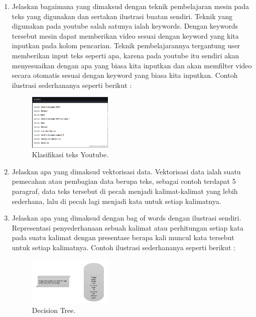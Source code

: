 \begin{enumerate}
	\item Jelaskan bagaimana yang dimaksud dengan teknik pembelajaran mesin pada teks yang digunakan dan sertakan ilustrasi buatan sendiri.
	\hfill\break
	Teknik yang digunakan pada youtube salah satunya ialah keywords. Dengan keywords tersebut mesin dapat memberikan video sesuai dengan keyword yang kita inputkan pada kolom pencarian. Teknik pembelajarannya tergantung user memberikan input teks seperti apa, karena pada youtube itu sendiri akan menyesuaikan dengan apa yang biasa kita inputkan dan akan memfilter video secara otomatis sesuai dengan keyword yang biasa kita inputkan. Contoh ilustrasi sederhananya seperti berikut :

	\begin{figure}[H]
	\centering
		\includegraphics[width=4cm]{figures/1174021/tugas4/materi/3.PNG}
		\caption{Klasifikasi teks Youtube.}
	\end{figure}

	\item Jelaskan apa yang dimaksud vektorisasi data.
	\hfill\break
	Vektorisasi data ialah suatu pemecahan atau pembagian data berupa teks, sebagai contoh terdapat 5 paragraf, data teks tersebut di pecah menjadi kalimat-kalimat yang lebih sederhana, lalu di pecah lagi menjadi kata untuk setiap kalimatnya. 

	\item Jelaskan apa yang dimaksud dengan bag of words dengan ilustrasi sendiri.
	\hfill\break
	Representasi penyederhanaan sebuah kalimat atau perhitungan setiap kata pada suatu kalimat dengan presentase berapa kali muncul kata tersebut untuk setiap kalimatnya. Contoh ilustrasi sederhananya seperti berikut : 

	\begin{figure}[H]
	\centering
		\includegraphics[width=4cm]{figures/1174021/tugas4/materi/4.PNG}
		\caption{Decision Tree.}
	\end{figure}


\end{enumerate}

